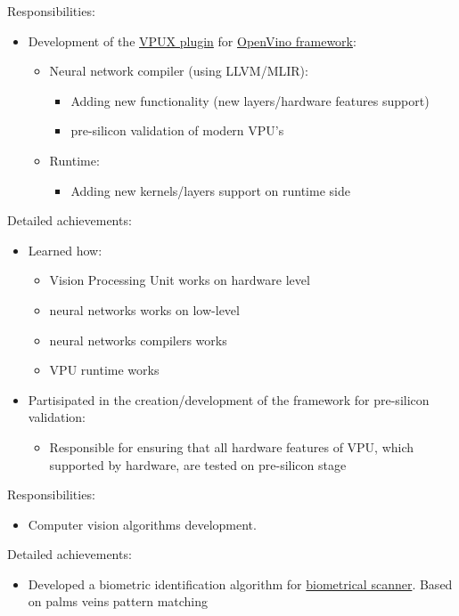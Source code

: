\documentclass[a4paper,11pt]{memoir}
\begin{document}
{
Responsibilities:
\begin{itemize}
	\item Development of the \href{https://github.com/openvinotoolkit/vpux-plugin}{VPUX plugin} for \href{https://github.com/openvinotoolkit/openvino}{OpenVino framework}:
	\begin{itemize}
		\item Neural network compiler (using LLVM/MLIR):
		\begin{itemize}
			\item Adding new functionality (new layers/hardware features support)
			\item pre-silicon validation of modern VPU's
		\end{itemize}
		\item Runtime:
		\begin{itemize}
			\item Adding new kernels/layers support on runtime side
		\end{itemize}
	\end{itemize}	
\end{itemize}
Detailed achievements:
\begin{itemize}
	\item Learned how:
	\begin{itemize} 
		\item Vision Processing Unit works on hardware level
		\item neural networks works on low-level
		\item neural networks compilers works
		\item VPU runtime works
	\end{itemize}
	\item Partisipated in the creation/development of the framework for pre-silicon validation:
	\begin{itemize}
		\item Responsible for ensuring that all hardware features of VPU, which \mbox{supported} by hardware, are tested on pre-silicon stage
	\end{itemize}
\end{itemize}
}

{
Responsibilities:
\begin{itemize}
	\item Computer vision algorithms development.
\end{itemize}
Detailed achievements:
\begin{itemize}
	\item Developed a biometric identification algorithm for \href{https://en.kalashnikovgroup.ru/media/perspektivnye-razrabotki/kontsern-kalashnikov-predstavil-sobstvennyy-biometricheskiy-skaner}{biometrical scanner}. Based on palms veins pattern matching
\end{itemize}
}
\end{document}
